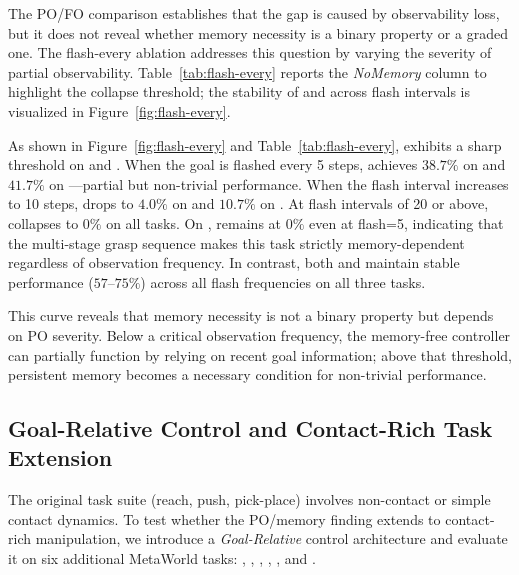 
\FloatBarrier

The PO/FO comparison establishes that the gap is caused by observability loss, but it does not reveal whether memory necessity is a binary property or a graded one. The flash-every ablation addresses this question by varying the severity of partial observability. Table~\ref{tab:flash-every} reports the \emph{NoMemory} column to highlight the collapse threshold; the stability of  and  across flash intervals is visualized in Figure~\ref{fig:flash-every}.

As shown in Figure~\ref{fig:flash-every} and Table~\ref{tab:flash-every},  exhibits a sharp threshold on  and . When the goal is flashed every 5 steps,  achieves $38.7\%$ on  and $41.7\%$ on ---partial but non-trivial performance. When the flash interval increases to 10 steps,  drops to $4.0\%$ on  and $10.7\%$ on . At flash intervals of 20 or above,  collapses to $0\%$ on all tasks. On ,  remains at $0\%$ even at flash=5, indicating that the multi-stage grasp sequence makes this task strictly memory-dependent regardless of observation frequency. In contrast, both  and  maintain stable performance ($57$--$75\%$) across all flash frequencies on all three tasks.

This curve reveals that memory necessity is not a binary property but depends on PO severity. Below a critical observation frequency, the memory-free controller can partially function by relying on recent goal information; above that threshold, persistent memory becomes a necessary condition for non-trivial performance.

\subsection{Goal-Relative Control and Contact-Rich Task Extension}
\label{sec:contact-rich}

The original task suite (reach, push, pick-place) involves non-contact or simple contact dynamics. To test whether the PO/memory finding extends to contact-rich manipulation, we introduce a \emph{Goal-Relative} control architecture and evaluate it on six additional MetaWorld tasks: , , , , , and .


